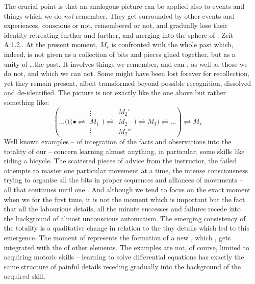 \pa The crucial point is that an analogous picture can be applied also to events
and things which we do {\em not} remember.  They get surrounded by other events
and experiences, conscious or not, remembered or not, and gradually lose their
identity retreating further and further, and merging into the sphere of
.  \citet{As the time-object withdraws into the past, it shrinks
  and therewith becomes dim.}{Zeit}{ A:1.2.{.}}  At the present moment, $M_{r}$ is confronted with
the whole past which, indeed, is not given as a collection of bits and pieces
glued together, but as a  unity of \ldots the past.  It involves
things we remember, and can , as well as those we do not, and
which we can not.  Some might have been lost forever for 
recollection, yet they remain present, albeit transformed beyond possible
recognition, dissolved and de-identified.  The picture is not exactly like the
one above but rather something like:
\[
  (\ldots\Big(\bigg( \Bigg(\bullet 
     \rightleftharpoons 
     \begin{array}{c}{\scriptscriptstyle{\vdots}}\\[-.5ex]
                     {\scriptscriptstyle{M_{1}}}\\ [-.5ex]
                     {\scriptscriptstyle{{\vdots}}}\end{array} 
     \Bigg) 
     \rightleftharpoons 
     \begin{array}{c}{\scriptstyle{M_{2}'}}\\[-.5ex]
                     {\scriptstyle{M_{2}}}\\ [-.5ex]
                     {\scriptstyle{{M_{2}''}}}\end{array} 
     \displaystyle\bigg)
     \rightleftharpoons M_{3}\Big) \rightleftharpoons \ldots )
     \rightleftharpoons M_{r}
\]
Well known examples -- of integration of the  facts and
observations into the totality of our  -- concern 
learning almost anything, in particular, some skills like riding a
bicycle. The scattered pieces of advice from the instructor, the failed attempts
to master one particular movement at a time, the intense consciousness trying
to organise all the bits in proper sequences and alliances of movements -- all 
that continues until one . And although we tend to focus on
the exact moment when we  for the first time, it is not the moment which
is important but the fact that all the labourious details, all the minute
successes and failures recede into the background of almost unconscious
automatism. The emerging consistency of the totality is a qualitative change in
relation to the tiny details which led to this emergence. The moment of
 represents the formation of a new , which
, gets integrated with the  of other elements.
The examples are not, of course, limited to acquiring motoric skills
-- learning to solve differential equations has exactly the same structure of
painful details receding gradually into the background of the acquired
skill.

